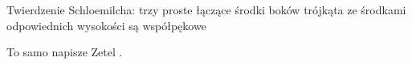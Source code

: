 Twierdzenie Schloemilcha: trzy proste łączące środki boków trójkąta ze środkami odpowiednich wysokości są współpękowe %

To samo napisze Zetel \cite[s. 34]{zetel_2020}.